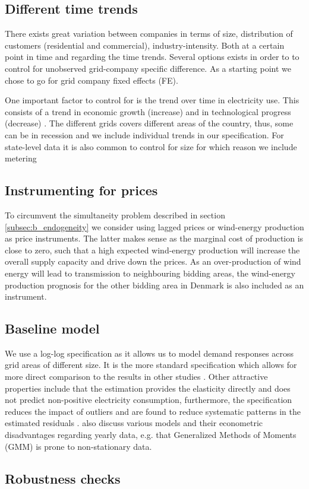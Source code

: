 \label{sec:empirical}
\subsection{Different time trends}
\label{subsec:e_trends}
There exists great variation between companies in terms of size, distribution of customers (residential and commercial), industry-intensity. Both at a certain point in time and regarding the time trends. Several options exists in order to to control for unobserved grid-company specific difference. As a starting point we chose to go for grid company fixed effects (FE).
\par
One important factor to control for is the trend over time in electricity use. This consists of a trend in economic growth (increase) and in technological progress (decrease) \citep{lijesen2007real}. The different grids covers different areas of the country, thus, some can be in recession and we include individual trends in our specification. For state-level data it is also common to control for size \citep{burke2017price} for which reason we include metering

\subsection{Instrumenting for prices}
\label{subsec:instruments}
To circumvent the simultaneity problem described in section \ref{subsec:b_endogeneity} we consider using lagged prices or wind-energy production as price instruments. The latter makes sense as the marginal cost of production is close to zero, such that a high expected wind-energy production will increase the overall supply capacity and drive down the prices. As an over-production of wind energy will lead to transmission to neighbouring bidding areas, the wind-energy production prognosis for the other bidding area in Denmark is also included as an instrument.

\subsection{Baseline model}
\label{subsec:model}
We use a log-log specification as it allows us to model demand responses across grid areas of different size. It is the more standard specification which allows for more direct comparison to the results in other studies \citep{burke2017price}. Other attractive properties include that the estimation provides the elasticity directly and does not predict non-positive electricity consumption, furthermore, the specification reduces the impact of outliers and are found to reduce systematic patterns in the estimated residuals \citep{burke2017price}. \citet{burke2017price}  also discuss various models and their econometric disadvantages regarding yearly data, e.g. that Generalized Methods of Moments (GMM) is prone to non-stationary data.


\subsection{Robustness checks}
\label{subsec:robustness}
